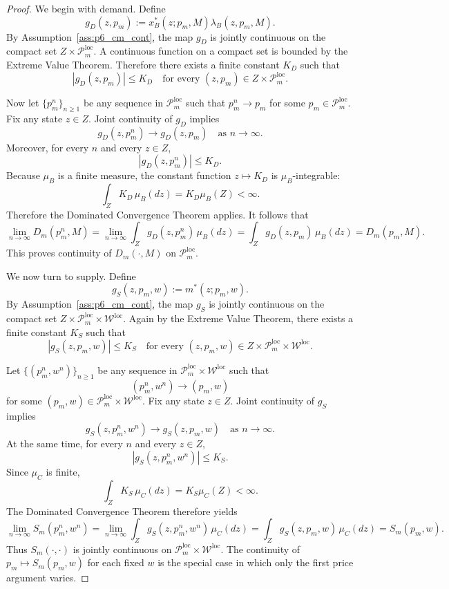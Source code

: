 \begin{proof}
We begin with demand. Define
\[
g_D(z,p_m):=x_B^*(z;p_m,M)\lambda_B(z,p_m,M).
\]
By Assumption~\ref{ass:p6_cm_cont}, the map $g_D$ is jointly continuous on the compact set $Z\times\mathcal P_m^{\mathrm{loc}}$. A continuous function on a compact set is bounded by the Extreme Value Theorem. Therefore there exists a finite constant $K_D$ such that
\[
|g_D(z,p_m)|\le K_D
\quad\text{for every } (z,p_m)\in Z\times\mathcal P_m^{\mathrm{loc}}.
\]

Now let $\{p_m^n\}_{n\ge 1}$ be any sequence in $\mathcal P_m^{\mathrm{loc}}$ such that $p_m^n\to p_m$ for some $p_m\in\mathcal P_m^{\mathrm{loc}}$. Fix any state $z\in Z$. Joint continuity of $g_D$ implies
\[
g_D(z,p_m^n)\to g_D(z,p_m)
\quad\text{as } n\to\infty.
\]
Moreover, for every $n$ and every $z\in Z$,
\[
|g_D(z,p_m^n)|\le K_D.
\]
Because $\mu_B$ is a finite measure, the constant function $z\mapsto K_D$ is $\mu_B$-integrable:
\[
\int_Z K_D\,\mu_B(dz)=K_D\mu_B(Z)<\infty.
\]
Therefore the Dominated Convergence Theorem applies. It follows that
\[
\lim_{n\to\infty} D_m(p_m^n,M)
=
\lim_{n\to\infty}\int_Z g_D(z,p_m^n)\,\mu_B(dz)
=
\int_Z g_D(z,p_m)\,\mu_B(dz)
=
D_m(p_m,M).
\]
This proves continuity of $D_m(\cdot,M)$ on $\mathcal P_m^{\mathrm{loc}}$.

We now turn to supply. Define
\[
g_S(z,p_m,w):=m^*(z;p_m,w).
\]
By Assumption~\ref{ass:p6_cm_cont}, the map $g_S$ is jointly continuous on the compact set $Z\times\mathcal P_m^{\mathrm{loc}}\times\mathcal W^{\mathrm{loc}}$. Again by the Extreme Value Theorem, there exists a finite constant $K_S$ such that
\[
|g_S(z,p_m,w)|\le K_S
\quad\text{for every } (z,p_m,w)\in Z\times\mathcal P_m^{\mathrm{loc}}\times\mathcal W^{\mathrm{loc}}.
\]

Let $\{(p_m^n,w^n)\}_{n\ge 1}$ be any sequence in $\mathcal P_m^{\mathrm{loc}}\times\mathcal W^{\mathrm{loc}}$ such that
\[
(p_m^n,w^n)\to(p_m,w)
\]
for some $(p_m,w)\in\mathcal P_m^{\mathrm{loc}}\times\mathcal W^{\mathrm{loc}}$. Fix any state $z\in Z$. Joint continuity of $g_S$ implies
\[
g_S(z,p_m^n,w^n)\to g_S(z,p_m,w)
\quad\text{as } n\to\infty.
\]
At the same time, for every $n$ and every $z\in Z$,
\[
|g_S(z,p_m^n,w^n)|\le K_S.
\]
Since $\mu_C$ is finite,
\[
\int_Z K_S\,\mu_C(dz)=K_S\mu_C(Z)<\infty.
\]
The Dominated Convergence Theorem therefore yields
\[
\lim_{n\to\infty} S_m(p_m^n,w^n)
=
\lim_{n\to\infty}\int_Z g_S(z,p_m^n,w^n)\,\mu_C(dz)
=
\int_Z g_S(z,p_m,w)\,\mu_C(dz)
=
S_m(p_m,w).
\]
Thus $S_m(\cdot,\cdot)$ is jointly continuous on $\mathcal P_m^{\mathrm{loc}}\times\mathcal W^{\mathrm{loc}}$. The continuity of $p_m\mapsto S_m(p_m,w)$ for each fixed $w$ is the special case in which only the first price argument varies.
\end{proof}

